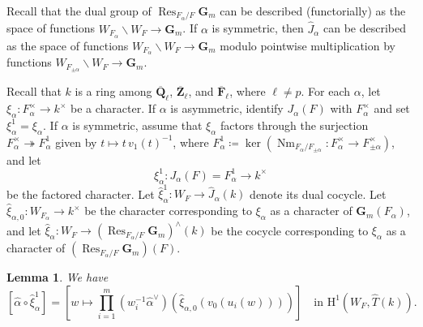 \documentclass[reqno]{amsart}
\numberwithin{equation}{subsection}
\newcommand{\F}{\mathbf{F}}
\newcommand{\G}{\mathbf{G}}
\newcommand{\Q}{\mathbf{Q}}
\newcommand{\Z}{\mathbf{Z}}
\newcommand{\ol}[1]{\overline{#1}}
\newcommand{\wh}[1]{\widehat{#1}}
\newcommand{\co}{\colon}
\newcommand{\surj}{\twoheadrightarrow}
\DeclareMathOperator{\Nm}{Nm}
\DeclareMathOperator{\Res}{Res}
\newcommand{\rH}{\ensuremath{\mathrm{H}}\xspace}
\newtheorem{lemma}[thm]{Lemma}
\theoremstyle{remark}
\numberwithin{equation}{subsection}
\numberwithin{figure}{subsection}
\begin{document}
Recall that the dual group of $\Res_{F_\alpha/F}\G_m$ can be described (functorially) as the space of functions $W_{F_\alpha}\backslash W_F \to \G_m$. If $\alpha$ is symmetric, then $\wh J_\alpha$ can be described as the space of functions $W_{F_\alpha}\backslash W_F\to\G_m$ modulo pointwise multiplication by functions $W_{F_{\pm\alpha}}\backslash W_F\to\G_m$.

Recall that $k$ is a ring among $\ol\Q_\ell$, $\ol\Z_\ell$, and $\ol\F_\ell$, where $\ell\neq p$.
For each $\alpha$, let $\xi_\alpha\co F_\alpha^\times\to k^\times$ be a character. If $\alpha$ is asymmetric, identify $J_\alpha(F)$ with $F_\alpha^\times$ and set $\xi_\alpha^1=\xi_\alpha$. If $\alpha$ is symmetric, assume that $\xi_\alpha$ factors through the surjection $F_\alpha^\times\surj F_\alpha^1$ given by $t\longmapsto t\,v_1(t)^{-1}$, where $F_\alpha^1 \coloneqq \ker(\Nm_{F_\alpha/F_{\pm\alpha}}\co F_\alpha^\times \to F_{\pm\alpha}^\times)$, and let
\[
\xi_\alpha^1\co J_\alpha(F)=F_\alpha^1\to k^\times
\]
be the factored character. Let $\wh \xi_\alpha^1\co W_F\to\wh J_\alpha(k)$ denote its dual cocycle. Let $\wh \xi_{\alpha,0}\co W_{F_\alpha}\to k^\times$ be the character corresponding to $\xi_\alpha$ as a character of $\G_m(F_\alpha)$, and let $\wh \xi_\alpha\co W_F\to(\Res_{F_\alpha/F}\G_m)^\land(k)$ be the cocycle corresponding to $\xi_\alpha$ as a character of $(\Res_{F_\alpha/F}\G_m)(F)$.

\begin{lemma}\label{lemma:dual-l-homs}
We have
\begin{equation}\label{eqn:l-hom-dual-to-root-sign}
[\wh\alpha \circ \wh \xi_\alpha^1] = \left[w\longmapsto \prod_{i=1}^m (w_i^{-1}\wh\alpha^\vee)(\wh \xi_{\alpha,0}(v_0(u_i(w))))\right]\quad\text{in }\rH^1(W_F, \wh T(k)).
\end{equation}
\end{lemma}
\end{document}
